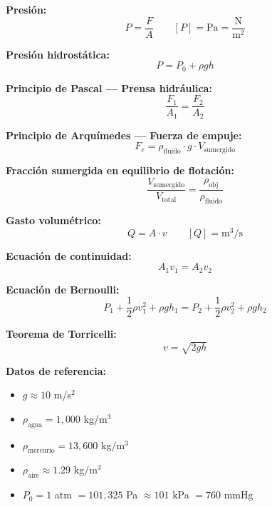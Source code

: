 \begin{nota}

\textbf{Presión:}
$$P = \frac{F}{A} \qquad [P] = \text{Pa} = \frac{\text{N}}{\text{m}^2}$$

\vspace{0.3cm}

\textbf{Presión hidrostática:}
$$P = P_0 + \rho g h$$

\vspace{0.3cm}

\textbf{Principio de Pascal — Prensa hidráulica:}
$$\frac{F_1}{A_1} = \frac{F_2}{A_2}$$

\vspace{0.3cm}

\textbf{Principio de Arquímedes — Fuerza de empuje:}
$$F_e = \rho_{\text{fluido}} \cdot g \cdot V_{\text{sumergido}}$$

\vspace{0.3cm}

\textbf{Fracción sumergida en equilibrio de flotación:}
$$\frac{V_{\text{sumergido}}}{V_{\text{total}}} = \frac{\rho_{\text{obj}}}{\rho_{\text{fluido}}}$$

\vspace{0.3cm}

\textbf{Gasto volumétrico:}
$$Q = A \cdot v \qquad [Q] = \text{m}^3/\text{s}$$

\vspace{0.3cm}

\textbf{Ecuación de continuidad:}
$$A_1 v_1 = A_2 v_2$$

\vspace{0.3cm}

\textbf{Ecuación de Bernoulli:}
$$P_1 + \frac{1}{2}\rho v_1^2 + \rho g h_1 = P_2 + \frac{1}{2}\rho v_2^2 + \rho g h_2$$

\vspace{0.3cm}

\textbf{Teorema de Torricelli:}
$$v = \sqrt{2gh}$$

\vspace{0.3cm}

\textbf{Datos de referencia:}
\begin{itemize}
    \item $g \approx 10$ m/s$^2$
    \item $\rho_{\text{agua}} = 1{,}000$ kg/m$^3$
    \item $\rho_{\text{mercurio}} = 13{,}600$ kg/m$^3$
    \item $\rho_{\text{aire}} \approx 1.29$ kg/m$^3$
    \item $P_0 = 1$ atm $= 101{,}325$ Pa $\approx 101$ kPa $= 760$ mmHg
\end{itemize}

\end{nota}
